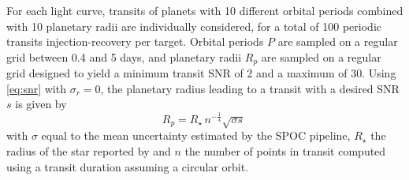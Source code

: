 \documentclass[modern]{aastex631}
\begin{document}
For each light curve, transits of planets with 10 different orbital periods combined with 10 planetary radii are individually considered, for a total of 100 periodic transits injection-recovery per target. Orbital periods $P$ are sampled on a regular grid between 0.4 and 5 days, and planetary radii $R_p$ are sampled on a regular grid designed to yield a minimum transit SNR of 2 and a maximum of 30. Using \autoref{eq:snr} with $\sigma_r = 0$, the planetary radius leading to a transit with a desired SNR $s$ is given by
\begin{equation*}
    R_p = R_{\star}\,n^{-\frac{1}{4}} \sqrt{\sigma s}\ %
\end{equation*}
with $\sigma$ equal to the mean uncertainty estimated by the SPOC pipeline, $R_\star$ the radius of the star reported by \cite{Ramsay2020} and $n$ the number of points in transit computed using a transit duration assuming a circular orbit.
\end{document}
